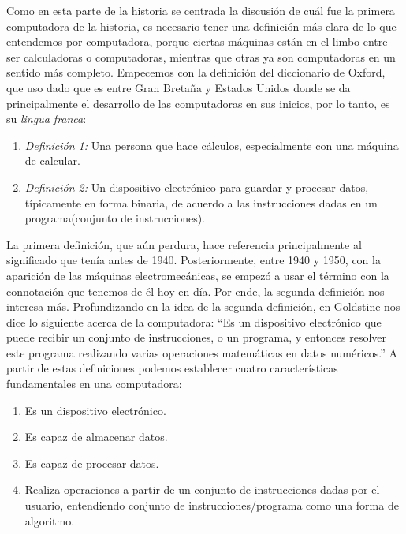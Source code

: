\documentclass[letterpaper,12pt,oneside]{book}
\begin{document}
		Como en esta parte de la historia se centrada la discusión de cuál fue la primera computadora de la historia, es necesario tener una definición
		más clara de lo que entendemos por computadora, porque ciertas máquinas están en el limbo entre ser calculadoras o computadoras, mientras que otras ya son computadoras en un sentido más completo. Empecemos con la definición 
		del diccionario de Oxford, que uso dado que es entre Gran Bretaña y Estados Unidos donde se da principalmente el desarrollo de las computadoras
		en sus inicios, por lo tanto, es su \textit{lingua franca}:
		\begin{enumerate}
			  \item[] \emph{ Definición 1:} Una persona que hace cálculos, especialmente con una máquina de calcular.
			  \item[] \emph{ Definición 2:} Un dispositivo electrónico para guardar y procesar datos, típicamente en forma binaria, de acuerdo a las instrucciones
			  dadas en un programa(conjunto de instrucciones).
		\end{enumerate}
		
		La primera definición, que aún perdura, hace referencia principalmente al significado que tenía antes de 1940. Posteriormente, entre 1940 y 1950,
		con la aparición de las máquinas electromecánicas, se empezó a usar el término con la connotación que tenemos de él hoy en día. Por ende,
		la segunda definición nos interesa más.  Profundizando en la idea de la segunda definición, en \cite{goldstine_computer_1972} Goldstine nos dice lo siguiente 
		acerca de la computadora: ``Es un dispositivo electrónico que puede recibir un conjunto de instrucciones, o un programa,
		y entonces resolver este programa realizando varias operaciones matemáticas en datos numéricos.'' A partir de estas definiciones podemos establecer
		cuatro características fundamentales en una computadora:
		
		\begin{enumerate}
			\item Es un dispositivo electrónico. 
			\item Es capaz de almacenar datos.
			\item Es capaz de procesar datos.
			\item Realiza operaciones a partir de un conjunto de instrucciones dadas por el usuario, entendiendo conjunto de instrucciones/programa como una forma de algoritmo.
		\end{enumerate}
		
\end{document}
